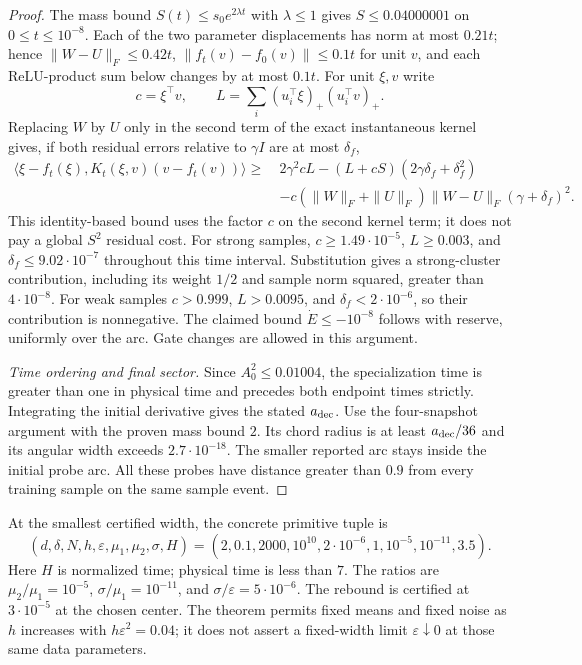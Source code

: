 \documentclass{article} %
\theoremstyle{plain}
\theoremstyle{definition}
\theoremstyle{remark}
\begin{document}
\begin{proof}
The mass bound $S(t)\le s_0e^{2\lambda t}$ with $\lambda\le1$
gives $S\le0.04000001$ on $0\le t\le10^{-8}$.
Each of the two parameter displacements has norm at most $0.21t$;
hence $\|W-U\|_F\le0.42t$, $\|f_t(v)-f_0(v)\|\le0.1t$ for unit $v$,
and each ReLU-product sum below changes by at most $0.1t$.
For unit $\xi,v$ write
\[
 c=\xi^\top v,\qquad
 L=\sum_i(u_i^\top\xi)_+(u_i^\top v)_+.
\]
Replacing $W$ by $U$ only in the second term of the exact instantaneous
kernel gives, if both residual errors relative to $\gamma I$ are at most
$\delta_f$,
\begin{align*}
 \langle\xi-f_t(\xi),K_t(\xi,v)(v-f_t(v))\rangle
 \ge\ &2\gamma^2cL-(L+cS)(2\gamma\delta_f+\delta_f^2)\\
 &-c(\|W\|_F+\|U\|_F)\|W-U\|_F(\gamma+\delta_f)^2.
\end{align*}
This identity-based bound uses the factor $c$ on the second kernel term;
it does not pay a global $S^2$ residual cost.
For strong samples, $c\ge1.49\cdot10^{-5}$, $L\ge0.003$, and
$\delta_f\le9.02\cdot10^{-7}$ throughout this time interval. Substitution
gives a strong-cluster contribution, including its weight $1/2$ and
sample norm squared, greater than $4\cdot10^{-8}$.
For weak samples $c>0.999$, $L>0.0095$, and
$\delta_f<2\cdot10^{-6}$, so their contribution is nonnegative.
The claimed bound $\dot E\le-10^{-8}$ follows with reserve, uniformly
over the arc. Gate changes are allowed in this argument.

\emph{Time ordering and final sector.}
Since $A_0^2\le0.01004$, the specialization time is greater than one
in physical time and precedes both endpoint times strictly.
Integrating the initial derivative gives the stated $a_{\rm dec}$.
Use the four-snapshot argument with the proven mass bound $2$.
Its chord radius is at least $a_{\rm dec}/36$ and its angular width
exceeds $2.7\cdot10^{-18}$. The smaller reported arc stays inside the
initial probe arc. All these probes have distance greater than $0.9$
from every training sample on the same sample event.
\end{proof}

At the smallest certified width, the concrete primitive tuple is
\[
 (d,\delta,N,h,\varepsilon,\mu_1,\mu_2,\sigma,H)
 =(2,0.1,2000,10^{10},2\cdot10^{-6},1,10^{-5},10^{-11},3.5).
\]
Here $H$ is normalized time; physical time is less than $7$.
The ratios are $\mu_2/\mu_1=10^{-5}$,
$\sigma/\mu_1=10^{-11}$, and $\sigma/\varepsilon=5\cdot10^{-6}$.
The rebound is certified at $3\cdot10^{-5}$ at the chosen center.
The theorem permits fixed means and fixed noise as $h$ increases with
$h\varepsilon^2=0.04$; it does not assert a fixed-width limit
$\varepsilon\downarrow0$ at those same data parameters.
\end{document}
